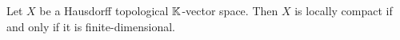 \documentclass[article, a4paper, 11pt, oneside]{memoir}
\numberwithin{equation}{chapter}
\begin{document}
    

\newcommand{\Span}{\operatorname{span}}

\begin{theorem}
    Let $X$ be a Hausdorff topological $\mathbb{K}$-vector space. Then $X$ is locally compact if and only if it is finite-dimensional.
\end{theorem}
\end{document}
